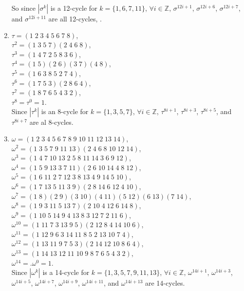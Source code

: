 \documentclass[12pt]{article}
\newcommand{\Z}{\mathbb{Z}}
\begin{document}
\begin{enumerate}[label=\textbf{\alph*.}]
            So since $|\sigma^k|$ is a 12-cycle for $k = \{ 1, 6, 7, 11 \}$,
            $\forall i \in \Z$, 
            $\sigma^{12i + 1}$, $\sigma^{12i + 6}$, $\sigma^{12i + 7}$, 
            and $\sigma^{12i + 11}$ are all 12-cycles, .
        \item 
            $\tau = (1\;2\;3\;4\;5\;6\;7\;8)$, \\
            $\tau^2 = (1\;3\;5\;7)(2\;4\;6\;8)$, \\
            $\tau^3 = (1\;4\;7\;2\;5\;8\;3\;6)$, \\
            $\tau^4 = (1\;5)(2\;6)(3\;7)(4\;8)$, \\
            $\tau^5 = (1\;6\;3\;8\;5\;2\;7\;4)$, \\
            $\tau^6 = (1\;7\;5\;3)(2\;8\;6\;4)$, \\
            $\tau^7 = (1\;8\;7\;6\;5\;4\;3\;2)$, \\
            $\tau^8 = \tau^0 = 1$. \\
            Since $|\tau^k|$ is an 8-cycle for $k = \{ 1, 3, 5, 7 \}$,
            $\forall i \in \Z$, 
            $\tau^{8i + 1}$, $\tau^{8i + 3}$, $\tau^{8i + 5}$, 
            and $\tau^{8i + 7}$ are al 8-cycles.
        \item
            $\omega = (1\;2\;3\;4\;5\;6\;7\;8\;9\;10\;11\;12\;13\;14)$, \\
            $\omega^2 = (1\;3\;5\;7\;9\;11\;13)(2\;4\;6\;8\;10\;12\;14)$, \\
            $\omega^3 = (1\;4\;7\;10\;13\;2\;5\;8\;11\;14\;3\;6\;9\;12)$, \\
            $\omega^4 = (1\;5\;9\;13\;3\;7\;11)(2\;6\;10\;14\;4\;8\;12)$, \\
            $\omega^5 = (1\;6\;11\;2\;7\;12\;3\;8\;13\;4\;9\;14\;5\;10)$, \\
            $\omega^6 = (1\;7\;13\;5\;11\;3\;9)(2\;8\;14\;6\;12\;4\;10)$, \\
            $\omega^7 = (1\;8)(2\;9)(3\;10)(4\;11)(5\;12)(6\;13)(7\;14)$, \\
            $\omega^8 = (1\;9\;3\;11\;5\;13\;7)(2\;10\;4\;12\;6\;14\;8)$, \\
            $\omega^9 = (1\;10\;5\;14\;9\;4\;13\;8\;3\;12\;7\;2\;11\;6)$, \\
            $\omega^{10} = (1\;11\;7\;3\;13\;9\;5)(2\;12\;8\;4\;14\;10\;6)$, \\
            $\omega^{11} = (1\;12\;9\;6\;3\;14\;11\;8\;5\;2\;13\;10\;7\;4)$, \\
            $\omega^{12} = (1\;13\;11\;9\;7\;5\;3)(2\;14\;12\;10\;8\;6\;4)$, \\
            $\omega^{13} = (1\;14\;13\;12\;11\;10\;9\;8\;7\;6\;5\;4\;3\;2)$, \\
            $\omega^{14} = .\omega^0 = 1$. \\
            Since $|\omega^k|$ is a 14-cycle for
            $k = \{ 1, 3, 5, 7, 9, 11, 13 \}$, $\forall i \in \Z$, 
            $\omega^{14i + 1}$, $\omega^{14i + 3}$, $\omega^{14i + 5}$,
            $\omega^{14i + 7}$, $\omega^{14i + 9}$, $\omega^{14i + 11}$,
            and $\omega^{14i + 13}$ are 14-cycles.
    \end{enumerate}
\end{document}
